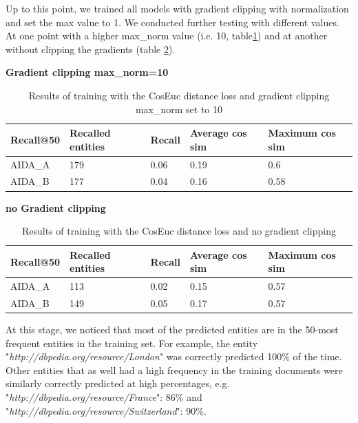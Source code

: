 Up to this point, we trained all models with gradient clipping with normalization and set the max value to 1. We conducted further testing with different values. At one point with a higher max\_norm value (i.e. 10, table\ref{3rdRound}) and at another without clipping the gradients (table \ref{3rdRound1}).\newline


\textbf{Gradient clipping max\_norm=10}
\begin{table}[h!]
\centering
\captionsetup{justification=centering,margin=2cm}
\begin{tabular}{ |p{3cm}||p{2.5cm}||p{2.5cm}|p{2.5cm}|p{2.5cm}|}
 \hline   
  Recall@50 & Recalled entities & Recall  & Average cos sim & Maximum cos sim\\
 \hline 
 AIDA\_A & 179 & 0.06 & 0.19 & 0.6 \\
 \hline
 AIDA\_B & 177 & 0.04 & 0.16 & 0.58\\
 \hline
\end{tabular}
\caption{Results of training with the CosEuc distance loss and gradient clipping max\_norm set to 10}
\label{3rdRound}
\end{table}

\textbf{no Gradient clipping}
\begin{table}[h!]
\centering
\captionsetup{justification=centering,margin=2cm}
\begin{tabular}{ |p{3cm}||p{2.5cm}||p{2.5cm}|p{2.5cm}|p{2.5cm}|}
 \hline   
  Recall@50 & Recalled entities & Recall  & Average cos sim & Maximum cos sim\\
 \hline 
 AIDA\_A & 113 & 0.02 & 0.15 & 0.57 \\
 \hline
 AIDA\_B & 149 & 0.05 & 0.17 & 0.57\\
 \hline
\end{tabular}
\caption{Results of training with the CosEuc distance loss and no gradient clipping}
\label{3rdRound1}
\end{table}

At this stage, we noticed that most of the predicted entities are in the 50-most frequent entities in the training set. For example, the entity "\textit{http://dbpedia.org/resource/London}" was correctly predicted 100\% of the time. \newline
Other entities that as well had a high frequency in the training documents were similarly correctly predicted at high percentages, e.g. "\textit{http://dbpedia.org/resource/France}": 86\% and "\textit{http://dbpedia.org/resource/Switzerland}": 90\%.\newline

